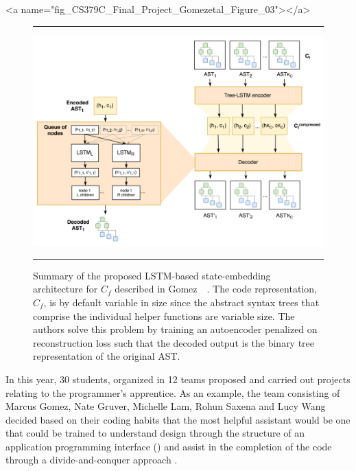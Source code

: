 \rawhtml
<a name="fig_CS379C_Final_Project_Gomezetal_Figure_03"></a>
\endrawhtml
\begin{figure}
%
  \hrule{}
%
  \begin{center}
    \includegraphics[width=11.0in]{./figures/CS379C_Final_Project_Gomezetal_Figure_03.png}
  \end{center}
%
  \caption{Summary of the proposed LSTM-based state-embedding architecture for $C_{f}$ described in Gomez~\etal{}~\cite{CS379C_Final_Project_Gomezetal-18}. The code representation, $C_{f}$, is by default variable in size since the abstract syntax trees that comprise the individual helper functions are variable size. The authors solve this problem by training an autoencoder penalized on reconstruction loss such that the decoded output is the binary tree representation of the original AST.}
%
  \hrule{}
%
\end{figure}


In {} this year, 30 students, organized in 12 teams proposed and carried out projects relating to the programmer's apprentice. As an example, the team consisting of Marcus Gomez, Nate Gruver, Michelle Lam, Rohun Saxena and Lucy Wang decided based on their coding habits that the most helpful assistant would be one that could be trained to understand design through the structure of an application programming interface ({}) and assist in the completion of the code through a divide-and-conquer approach {}.

